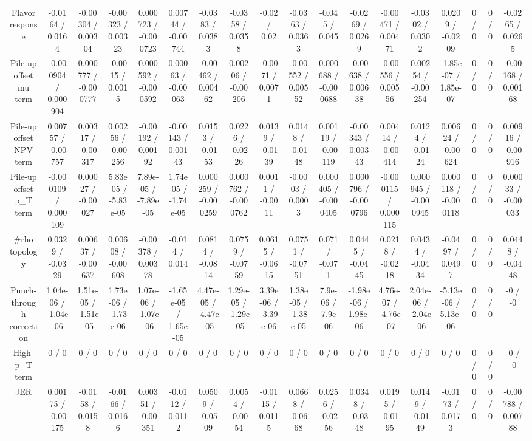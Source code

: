 \documentclass[10pt]{article}
\begin{document}
\begin{table}[htbp]
\begin{center}
\begin{tabular}{|c|c|c|c|c|c|c|c|c|c|c|c|c|c|c|c|c|c|}
  Flavor response & -0.0164 / 0.0164 & -0.00304 / 0.00304 & -0.00323 / 0.00323 & 0.000723 / -0.000723 & 0.00744 / -0.00744 & -0.0383 / 0.0383 & -0.0358 / 0.0358 & -0.02 / 0.02 & -0.0363 / 0.0363 & -0.045 / 0.045 & -0.0269 / 0.0269 & -0.00471 / 0.00471 & -0.0302 / 0.0302 & 0.0209 / -0.0209 & 0 / 0 & 0 / 0 & -0.0265 / 0.0265 \\ 
  Pile-up offset mu term & -0.000904 / 0.000904 & 0.000777 / -0.000777 & -0.0015 / 0.0015 & 0.000592 / -0.000592 & 0.00063 / -0.00063 & -0.00462 / 0.00462 & 0.00206 / -0.00206 & -0.0071 / 0.0071 & -0.00552 / 0.00552 & 0.000688 / -0.000688 & -0.00638 / 0.00638 & -0.00556 / 0.00556 & 0.00254 / -0.00254 & -1.85e-07 / 1.85e-07 & 0 / 0 & 0 / 0 & -0.00168 / 0.00168 \\ 
  Pile-up offset NPV term & 0.00757 / -0.00757 & 0.00317 / -0.00317 & 0.00256 / -0.00256 & -0.00192 / 0.00192 & -0.00143 / 0.00143 & 0.0153 / -0.0153 & 0.0226 / -0.0226 & 0.0139 / -0.0139 & 0.0148 / -0.0148 & 0.00119 / -0.00119 & -0.00343 / 0.00343 & 0.00414 / -0.00414 & 0.0124 / -0.0124 & 0.00624 / -0.00624 & 0 / 0 & 0 / 0 & 0.00916 / -0.00916 \\ 
  Pile-up offset p_{T} term & -0.000109 / 0.000109 & 0.00027 / -0.00027 & 5.83e-05 / -5.83e-05 & 7.89e-05 / -7.89e-05 & 1.74e-05 / -1.74e-05 & 0.000259 / -0.000259 & 0.000762 / -0.000762 & 0.0011 / -0.0011 & -0.0003 / 0.0003 & 0.000405 / -0.000405 & 0.000796 / -0.000796 & -0.000115 / 0.000115 & 0.000945 / -0.000945 & 0.000118 / -0.000118 & 0 / 0 & 0 / 0 & 0.00033 / -0.00033 \\ 
  #rho topology & 0.0329 / -0.0329 & 0.00637 / -0.00637 & 0.00608 / -0.00608 & -0.00378 / 0.00378 & -0.014 / 0.014 & 0.0814 / -0.0814 & 0.0759 / -0.0759 & 0.0615 / -0.0615 & 0.0751 / -0.0751 & 0.071 / -0.071 & 0.0445 / -0.0445 & 0.0218 / -0.0218 & 0.0434 / -0.0434 & -0.0497 / 0.0497 & 0 / 0 & 0 / 0 & 0.0448 / -0.0448 \\ 
  Punch-through correction & 1.04e-06 / -1.04e-06 & 1.51e-05 / -1.51e-05 & 1.73e-06 / -1.73e-06 & 1.07e-06 / -1.07e-06 & -1.65e-05 / 1.65e-05 & 4.47e-05 / -4.47e-05 & 1.29e-05 / -1.29e-05 & 3.39e-06 / -3.39e-06 & 1.38e-05 / -1.38e-05 & 7.9e-06 / -7.9e-06 & -1.98e-06 / 1.98e-06 & 4.76e-07 / -4.76e-07 & 2.04e-06 / -2.04e-06 & -5.13e-06 / 5.13e-06 & 0 / 0 & 0 / 0 & -0 / -0 \\ 
  High-p_{T} term & 0 / 0 & 0 / 0 & 0 / 0 & 0 / 0 & 0 / 0 & 0 / 0 & 0 / 0 & 0 / 0 & 0 / 0 & 0 / 0 & 0 / 0 & 0 / 0 & 0 / 0 & 0 / 0 & 0 / 0 & 0 / 0 & -0 / -0 \\ 
  JER & 0.00175 / -0.00175 & -0.0158 / 0.0158 & -0.0166 / 0.0166 & 0.00351 / -0.00351 & -0.0112 / 0.0112 & 0.0509 / -0.0509 & 0.0054 / -0.0054 & -0.0115 / 0.0115 & 0.0668 / -0.0668 & 0.0256 / -0.0256 & 0.0348 / -0.0348 & 0.0195 / -0.0195 & 0.0149 / -0.0149 & -0.0173 / 0.0173 & 0 / 0 & 0 / 0 & -0.00788 / 0.00788 \\ 

\end{tabular}
\end{center}
\end{table}
\end{document}
